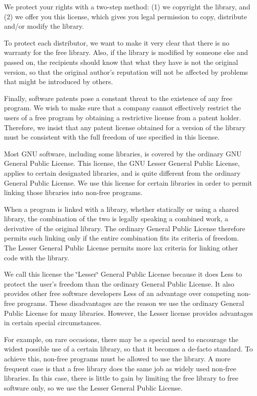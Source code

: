 We protect your rights with a two-step method: (1) we copyright the library, and (2) we offer you this license, which gives you legal permission to copy, distribute and/or modify the library.

To protect each distributor, we want to make it very clear that there is no warranty for the free library. Also, if the library is modified by someone else and passed on, the recipients should know that what they have is not the original version, so that the original author's reputation will not be affected by problems that might be introduced by others.

Finally, software patents pose a constant threat to the existence of any free program. We wish to make sure that a company cannot effectively restrict the users of a free program by obtaining a restrictive license from a patent holder. Therefore, we insist that any patent license obtained for a version of the library must be consistent with the full freedom of use specified in this license.

Most GNU software, including some libraries, is covered by the ordinary GNU General Public License. This license, the GNU Lesser General Public License, applies to certain designated libraries, and is quite different from the ordinary General Public License. We use this license for certain libraries in order to permit linking those libraries into non-free programs.

When a program is linked with a library, whether statically or using a shared library, the combination of the two is legally speaking a combined work, a derivative of the original library. The ordinary General Public License therefore permits such linking only if the entire combination fits its criteria of freedom. The Lesser General Public License permits more lax criteria for linking other code with the library.

We call this license the \char`\"{}Lesser\char`\"{} General Public License because it does Less to protect the user's freedom than the ordinary General Public License. It also provides other free software developers Less of an advantage over competing non-free programs. These disadvantages are the reason we use the ordinary General Public License for many libraries. However, the Lesser license provides advantages in certain special circumstances.

For example, on rare occasions, there may be a special need to encourage the widest possible use of a certain library, so that it becomes a de-facto standard. To achieve this, non-free programs must be allowed to use the library. A more frequent case is that a free library does the same job as widely used non-free libraries. In this case, there is little to gain by limiting the free library to free software only, so we use the Lesser General Public License.

